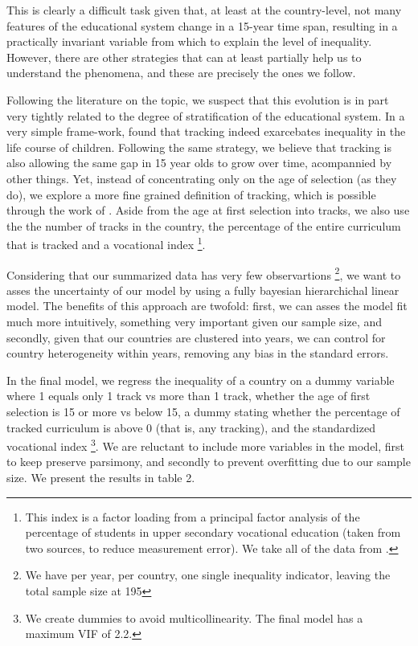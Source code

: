 \documentclass[11pt, a4paper]{article}\usepackage[]{graphicx}\usepackage[]{color}
\begin{document}
This is clearly a difficult task given that, at least at the country-level, not many features of the educational system change in a 15-year time span, resulting in a practically invariant variable from which to explain the level of inequality. However, there are other strategies that can at least partially help us to understand the phenomena, and these are precisely the ones we follow.

Following the literature on the topic, we suspect that this evolution is in part very tightly related to the degree of stratification of the educational system. In a very simple frame-work, \citet{hanushek_woesmann_tracking} found that tracking indeed exarcebates inequality in the life course of children. Following the same strategy, we believe that tracking is also allowing the same gap in 15 year olds to grow over time, acompannied by other things. Yet, instead of concentrating only on the age of selection (as they do), we explore a more fine grained definition of tracking, which is possible through the work of \citet{bol2013}. Aside from the age at first selection into tracks, we also use the the number of tracks in the country, the percentage of the entire curriculum that is tracked and a vocational index \footnote{This index is a factor loading from a principal factor analysis of the percentage of students in upper secondary vocational education (taken from two sources, to reduce measurement error). We take all of the data from \citet{bol2013}.}.

Considering that our summarized data has very few observartions \footnote{We have per year, per country, one single inequality indicator, leaving the total sample size at 195}, we want to asses the uncertainty of our model by using a fully bayesian hierarchichal linear model. The benefits of this approach are twofold: first, we can asses the model fit much more intuitively, something very important given our sample size, and secondly, given that our countries are clustered into years, we can control for country heterogeneity within years, removing any bias in the standard errors.

In the final model, we regress the inequality of a country on a dummy variable where 1 equals only 1 track vs more than 1 track, whether the age of first selection is 15 or more vs below 15, a dummy stating whether the percentage of tracked curriculum is above 0 (that is, any tracking), and the standardized vocational index \footnote{We create dummies to avoid multicollinearity. The final model has a maximum VIF of 2.2.}. We are reluctant to include more variables in the model, first to keep preserve parsimony, and secondly to prevent overfitting due to our sample size. We present the results in table 2.
\end{document}
